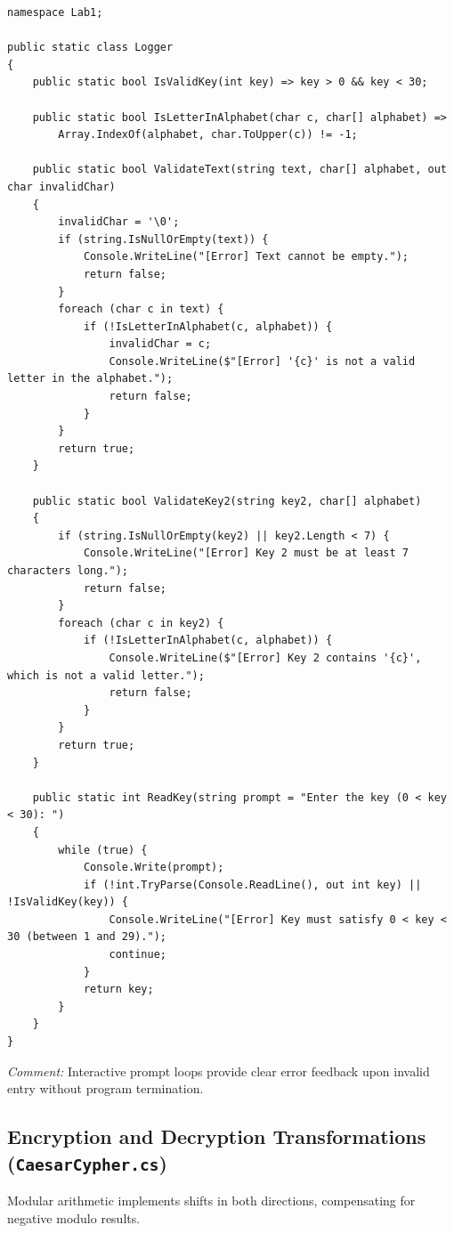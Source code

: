 \documentclass[12pt,a4paper]{article}
\begin{document}
\begin{lstlisting}[style=csharpstyle, caption={Input validation routines in logger.cs}]
namespace Lab1;

public static class Logger
{
    public static bool IsValidKey(int key) => key > 0 && key < 30;

    public static bool IsLetterInAlphabet(char c, char[] alphabet) =>
        Array.IndexOf(alphabet, char.ToUpper(c)) != -1;

    public static bool ValidateText(string text, char[] alphabet, out char invalidChar)
    {
        invalidChar = '\0';
        if (string.IsNullOrEmpty(text)) {
            Console.WriteLine("[Error] Text cannot be empty.");
            return false;
        }
        foreach (char c in text) {
            if (!IsLetterInAlphabet(c, alphabet)) {
                invalidChar = c;
                Console.WriteLine($"[Error] '{c}' is not a valid letter in the alphabet.");
                return false;
            }
        }
        return true;
    }

    public static bool ValidateKey2(string key2, char[] alphabet)
    {
        if (string.IsNullOrEmpty(key2) || key2.Length < 7) {
            Console.WriteLine("[Error] Key 2 must be at least 7 characters long.");
            return false;
        }
        foreach (char c in key2) {
            if (!IsLetterInAlphabet(c, alphabet)) {
                Console.WriteLine($"[Error] Key 2 contains '{c}', which is not a valid letter.");
                return false;
            }
        }
        return true;
    }

    public static int ReadKey(string prompt = "Enter the key (0 < key < 30): ")
    {
        while (true) {
            Console.Write(prompt);
            if (!int.TryParse(Console.ReadLine(), out int key) || !IsValidKey(key)) {
                Console.WriteLine("[Error] Key must satisfy 0 < key < 30 (between 1 and 29).");
                continue;
            }
            return key;
        }
    }
}
\end{lstlisting}
\textit{Comment:} Interactive prompt loops provide clear error feedback upon invalid entry without program termination.

\subsection{Encryption and Decryption Transformations (\texttt{CaesarCypher.cs})}
Modular arithmetic implements shifts in both directions, compensating for negative modulo results.
\end{document}
